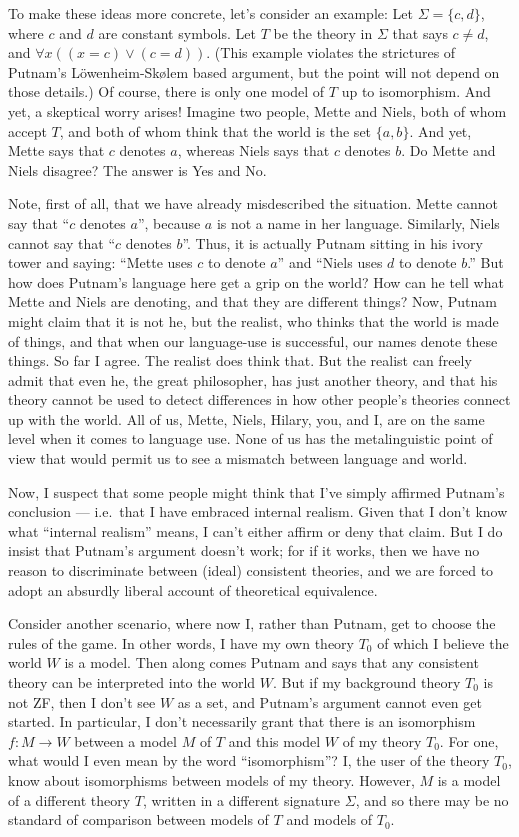 To make these ideas more concrete, let's consider an example: Let
$\Sigma = \{ c,d\}$, where $c$ and $d$ are constant symbols.  Let $T$
be the theory in $\Sigma$ that says $c\neq d$, and
$\forall x((x=c)\vee (c=d))$.  (This example violates the strictures
of Putnam's L{\"o}wenheim-Sk{\o}lem based argument, but the point will
not depend on those details.)  Of course, there is only one model of
$T$ up to isomorphism.  And yet, a skeptical worry arises!  Imagine
two people, Mette and Niels, both of whom accept $T$, and both of whom
think that the world is the set $\{ a,b\}$.  And yet, Mette says that
$c$ denotes $a$, whereas Niels says that $c$ denotes $b$.  Do Mette
and Niels disagree?  The answer is Yes and No.

Note, first of all, that we have already misdescribed the situation.
Mette cannot say that ``$c$ denotes $a$'', because $a$ is not a name
in her language.  Similarly, Niels cannot say that ``$c$ denotes
$b$''.  Thus, it is actually Putnam sitting in his ivory tower and
saying: ``Mette uses $c$ to denote $a$'' and ``Niels uses $d$ to
denote $b$.''  But how does Putnam's language here get a grip on the
world?  How can he tell what Mette and Niels are denoting, and that
they are different things?  Now, Putnam might claim that it is not he,
but the realist, who thinks that the world is made of things, and that
when our language-use is successful, our names denote these things.  So
far I agree.  The realist does think that.  But the realist can freely
admit that even he, the great philosopher, has just another theory,
and that his theory cannot be used to detect differences in how other
people's theories connect up with the world.  All of us, Mette, Niels,
Hilary, you, and I, are on the same level when it comes to language
use.  None of us has the metalinguistic point of view that would
permit us to see a mismatch between language and world.

Now, I suspect that some people might think that I've simply affirmed
Putnam's conclusion --- i.e.\ that I have embraced internal realism.
Given that I don't know what ``internal realism'' means, I can't
either affirm or deny that claim.  But I do insist that Putnam's
argument doesn't work; for if it works, then we have no reason to
discriminate between (ideal) consistent theories, and we are forced to
adopt an absurdly liberal account of theoretical equivalence.

Consider another scenario, where now I, rather than Putnam, get to
choose the rules of the game.  In other words, I have my own theory
$T_0$ of which I believe the world $W$ is a model.  Then along comes
Putnam and says that any consistent theory can be interpreted into the
world $W$.  But if my background theory $T_0$ is not ZF, then I don't
see $W$ as a set, and Putnam's argument cannot even get started.  In
particular, I don't necessarily grant that there is an isomorphism
$f:M\to W$ between a model $M$ of $T$ and this model $W$ of my theory
$T_0$.  For one, what would I even mean by the word ``isomorphism''?
I, the user of the theory $T_0$, know about isomorphisms between
models of my theory.  However, $M$ is a model of a different theory
$T$, written in a different signature $\Sigma$, and so there may be no
standard of comparison between models of $T$ and models of $T_0$.

